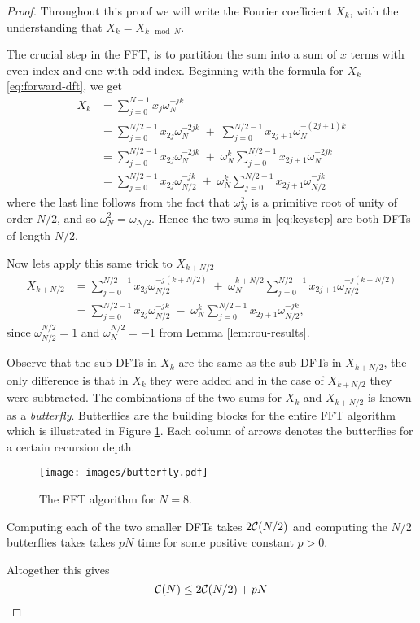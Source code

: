 \begin{proof}
    Throughout this proof we will write the Fourier coefficient $X_k$, with the understanding that $X_{k} = X_{k \mod N}$.

    The crucial step in the FFT, is to partition the sum into a sum of $x$ terms with even index and one with odd index. Beginning with the formula for $X_k$ \eqref{eq:forward-dft}, we get
    \begin{align}
        X_k
        &= \sum^{N-1}_{j=0}x_j\omega_N^{\minus jk} \nonumber\\
        &= \sum^{N/2-1}_{j=0}x_{2j}\omega_N^{\minus 2jk} \;+\; \sum^{N/2-1}_{j=0}x_{2j+1} \omega_N^{\minus (2j+1)k} \nonumber\\
        &= \sum^{N/2-1}_{j=0}x_{2j}\omega_N^{\minus 2jk} \;+\; \omega_N^k \sum^{N/2-1}_{j=0}x_{2j+1}\omega_N^{\minus 2jk}\\
        &= \sum^{N/2-1}_{j=0}x_{2j}\omega_{N/2}^{\minus jk} \;+\; \omega_N^k \sum^{N/2-1}_{j=0}x_{2j+1}\omega_{N/2}^{\minus jk} \label{eq:keystep}
    \end{align}
    where the last line follows from the fact that $\omega_N^2$ is a primitive root of unity of order $N/2$, and so $\omega_N^2 = \omega_{N/2}$. Hence the two sums in \eqref{eq:keystep} are both DFTs of length $N/2$. 

    Now lets apply this same trick to $X_{k + N/2}$
    \begin{align*}
        X_{k + N/2}
    &= \sum^{N/2-1}_{j=0}x_{2j}\omega_{N/2}^{\minus j(k + N/2)} \;+\; \omega_N^{k+ N/2} \sum^{N/2-1}_{j=0}x_{2j+1}\omega_{N/2}^{\minus j(k + N/2)}\\
    &= \sum^{N/2-1}_{j=0}x_{2j}\omega_{N/2}^{\minus jk} \;-\; \omega_N^k \sum^{N/2-1}_{j=0}x_{2j+1}\omega_{N/2}^{\minus jk},
    \end{align*}
    since $\omega_{N/2}^{N/2} = 1$ and $\omega_N^{N/2} = -1$ from Lemma \ref{lem:rou-results}.

    Observe that the sub-DFTs in $X_k$ are the same as the sub-DFTs in $X_{k + N/2}$, the only difference is that in $X_k$ they were added and in the case of $X_{k + N/2}$ they were subtracted. The combinations of the two sums for $X_k$ and $X_{k + N/2}$ is known as a \textit{butterfly}. Butterflies are the building blocks for the entire FFT algorithm which is illustrated in Figure \ref{fig:butterflies}. Each column of arrows denotes the butterflies for a certain recursion depth.
    
    \begin{figure}[t]
        \centering
        \texttt{[image: images/butterfly.pdf]}
        \caption{The FFT algorithm for $N = 8$.}
        \label{fig:butterflies}
    \end{figure}

    Computing each of the two smaller DFTs takes $2\mathcal C(N/2)$ and computing the $N/2$ butterflies takes takes $pN$ time for some positive constant $p > 0$.

    Altogether this gives
    \[
        \mathcal C(N) \le 2 \mathcal C(N/2) + pN
    \]
\end{proof}


